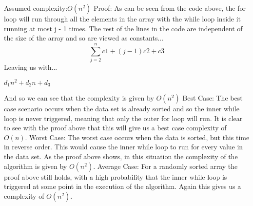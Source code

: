 \documentclass{article}
\begin{document}
Assumed complexity:\begin{math}O(n^2) \end{math}
\newline\newline\newline\newline
Proof:
\newline
As can be seen from the code above, the for loop will run through all the elements in the array with the while loop inside it running at most j - 1 times. The rest of the lines in the code are independent of the size of the array and so are viewed as constants...
\newline\newline
$$\sum_{j=2}^{n} c1 + (j - 1)c2 + c3$$
\newline\newline
Leaving us with...
\newline\newline
\centerline{
\begin{math}
d_1n^2 + d_2n + d_3
\end{math}
}
\newline\newline
And so we can see that the complexity is given by \begin{math}O(n^2)\end{math}
\newline\newline
Best Case:
\newline
The best case scenario occurs when the data set is already sorted and so the inner while loop is never triggered, meaning that only the outer for loop will run. It is clear to see with the proof above that this will give us a best case complexity of \begin{math}O(n)\end{math}.
\newline\newline
Worst Case:
\newline
The worst case occurs when the data is sorted, but this time in reverse order. This would cause the inner while loop to run for every value in the data set. As the proof above shows, in this situation the complexity of the algorithm is given by \begin{math}O(n^2)\end{math}.
\newline\newline
Average Case:
\newline
For a randomly sorted array the proof above still holds, with a high probability that the inner while loop is triggered at some point in the execution of the algorithm. Again this gives us a complexity of  \begin{math}O(n^2)\end{math}.
\end{document}
